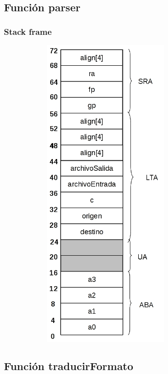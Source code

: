 \documentclass[a4paper,10pt]{article}
\begin{document}
  \subsection{Funci\'on parser}
    \subsubsection{Stack frame}
      \begin{center}
	\includegraphics[width=11cm, height=16cm]{DibujosStackFrame/stack-parser.jpg}
      \end{center}

  \subsection{Funci\'on traducirFormato}
\end{document}
